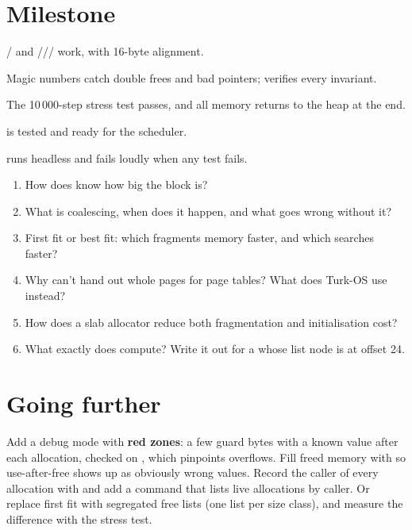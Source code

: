 \documentclass[11pt,a4paper]{article}
\begin{document}
\section{Milestone}

\begin{milestonebox}
\begin{checklist}
  \item {}/ and /// work, with 16-byte alignment.
  \item Magic numbers catch double frees and bad pointers;  verifies every invariant.
  \item The 10\,000-step stress test passes, and all memory returns to the heap at the end.
  \item {} is tested and ready for the scheduler.
  \item {} runs headless and fails loudly when any test fails.
\end{checklist}
\end{milestonebox}

\begin{questionbox}
\begin{enumerate}
  \item How does  know how big the block is?
  \item What is coalescing, when does it happen, and what goes wrong without it?
  \item First fit or best fit: which fragments memory faster, and which searches faster?
  \item Why can't  hand out whole pages for page tables? What does Turk-OS use instead?
  \item How does a slab allocator reduce both fragmentation and initialisation cost?
  \item What exactly does  compute? Write it out for a  whose list node is at offset 24.
\end{enumerate}
\end{questionbox}

\section{Going further}

Add a debug mode with \textbf{red zones}: a few guard bytes with a known value after each allocation, checked on
, which pinpoints overflows. Fill freed memory with  so use-after-free shows up as
obviously wrong values. Record the caller of every allocation with  and add a
 command that lists live allocations by caller. Or replace first fit with segregated free lists (one list
per size class), and measure the difference with the stress test.

\booklegend
\end{document}
